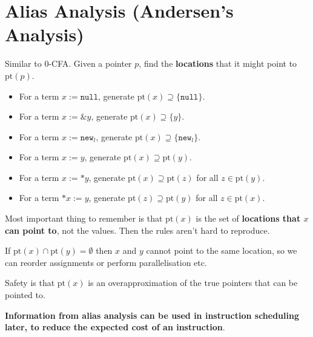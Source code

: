 \documentclass[a4paper, 11pt]{article}
\begin{document}
\section*{Alias Analysis (Andersen's Analysis)}
{
    Similar to 0-CFA. Given a pointer \(p\), find the \textbf{locations} that it might point to \(\text{pt}(p)\).

    \begin{itemize}
    \item For a term \(x := \texttt{null}\), generate \(\text{pt}(x) \supseteq \{\texttt{null}\}\).
    \item For a term \(x := \&y\), generate \(\text{pt}(x) \supseteq \{y\}\).
    \item For a term \(x := \texttt{new}_l\), generate \(\text{pt}(x) \supseteq \{\texttt{new}_l\}\).
    \item For a term \(x := y\), generate \(\text{pt}(x) \supseteq \text{pt}(y)\).
    \item For a term \(x := *y\), generate \(\text{pt}(x) \supseteq \text{pt}(z)\) for all \(z \in \text{pt}(y)\).
    \item For a term \(*x := y\), generate \(\text{pt}(z) \supseteq \text{pt}(y)\) for all \(z \in \text{pt}(x)\).
    \end{itemize}

    Most important thing to remember is that \(\text{pt}(x)\) is the set of \textbf{locations that \(x\) can point to}, not the values. Then the rules aren't hard to reproduce.

    If \(\text{pt}(x) \cap \text{pt}(y) = \emptyset\) then \(x\) and \(y\) cannot point to the same location, so we can reorder assignments or perform parallelisation etc.

    Safety is that \(\text{pt}(x)\) is an overapproximation of the true pointers that can be pointed to.

    \textbf{Information from alias analysis can be used in instruction scheduling later, to reduce the expected cost of an instruction}.
}
\end{document}
